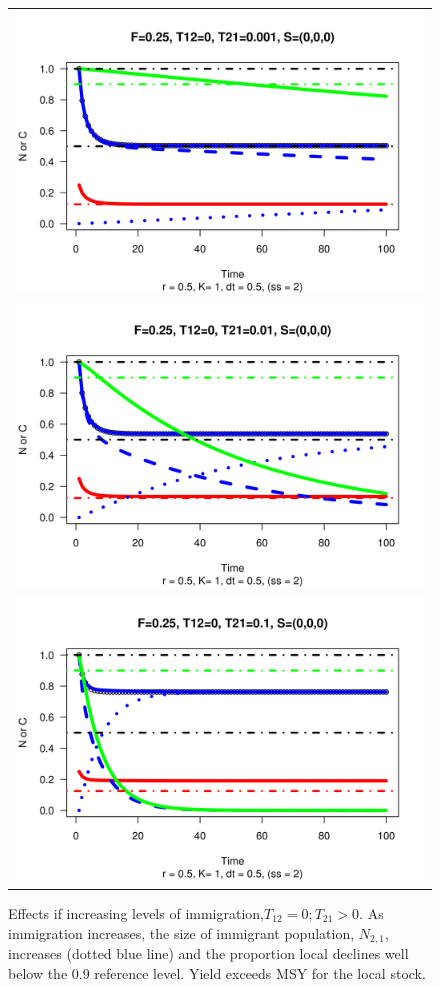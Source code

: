 \documentclass[12pt,letterpaper]{article}
\newcommand\Ntwo{{N_{2,1}}}
\begin{document}
\begin{figure}
\begin{center}
\begin{tabular}{c}
\includegraphics[height=0.5\textwidth]{./graphics/r05F025T120T210001S000.png}\\
\includegraphics[height=0.5\textwidth]{./graphics/r05F025T120T21001S000.png}\\
\includegraphics[height=0.5\textwidth]{./graphics/r05F025T120T2101S000.png}\\
\end{tabular}
\caption{\label{fig:immigration}
Effects if increasing levels of immigration,$T_{12} = 0; T_{21} > 0$.
As immigration increases, the size of immigrant population, $\Ntwo$,
increases (dotted blue line) and the proportion local declines well
below the 0.9 reference level. Yield exceeds MSY for the local stock.
}
\end{center}
\end{figure}
\end{document}
